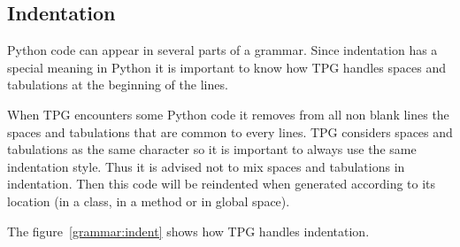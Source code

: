 \subsection{Indentation}

Python code can appear in several parts of a grammar.
Since indentation has a special meaning in Python it is important to know how TPG handles spaces and tabulations at the beginning of the lines.

When TPG encounters some Python code it removes from all non blank lines the spaces and tabulations that are common to every lines.
TPG considers spaces and tabulations as the same character so it is important to always use the same indentation style.
Thus it is advised not to mix spaces and tabulations in indentation.
Then this code will be reindented when generated according to its location (in a class, in a method or in global space).

The figure~\ref{grammar:indent} shows how TPG handles indentation.

